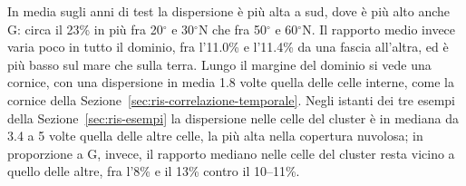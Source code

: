 In media sugli anni di test la dispersione è più alta a sud, dove è più alto anche G: circa il 23\% in più fra 20$^\circ$ e 30$^\circ$N che fra 50$^\circ$ e 60$^\circ$N. Il rapporto medio invece varia poco in tutto il dominio, fra l'11.0\% e l'11.4\% da una fascia all'altra, ed è più basso sul mare che sulla terra. Lungo il margine del dominio si vede una cornice, con una dispersione in media 1.8 volte quella delle celle interne, come la cornice della Sezione~\ref{sec:ris-correlazione-temporale}. Negli istanti dei tre esempi della Sezione~\ref{sec:ris-esempi} la dispersione nelle celle del cluster è in mediana da 3.4 a 5 volte quella delle altre celle, la più alta nella copertura nuvolosa; in proporzione a G, invece, il rapporto mediano nelle celle del cluster resta vicino a quello delle altre, fra l'8\% e il 13\% contro il 10--11\%.



